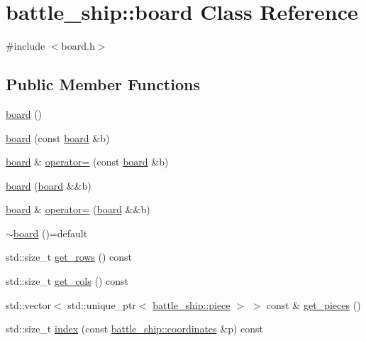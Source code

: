 \hypertarget{classbattle__ship_1_1board}{}\section{battle\+\_\+ship\+:\+:board Class Reference}
\label{classbattle__ship_1_1board}


{\ttfamily \#include $<$board.\+h$>$}

\subsection*{Public Member Functions}
\begin{DoxyCompactItemize}
\item 
\hyperlink{classbattle__ship_1_1board_a4d561505fe0c5d355e70bbd2bde1b00e}{board} ()
\item 
\hyperlink{classbattle__ship_1_1board_a72bdef4b84b4c2d8241b4307cae2cb9e}{board} (const \hyperlink{classbattle__ship_1_1board}{board} \&b)
\item 
\hyperlink{classbattle__ship_1_1board}{board} \& \hyperlink{classbattle__ship_1_1board_a4349c045147f686d09cdc47690f15e34}{operator=} (const \hyperlink{classbattle__ship_1_1board}{board} \&b)
\item 
\hyperlink{classbattle__ship_1_1board_aae7ac9e7bbd44c1b2d7a745721936ee2}{board} (\hyperlink{classbattle__ship_1_1board}{board} \&\&b)
\item 
\hyperlink{classbattle__ship_1_1board}{board} \& \hyperlink{classbattle__ship_1_1board_ae6dc011dea24157e59e2b3a6f34af586}{operator=} (\hyperlink{classbattle__ship_1_1board}{board} \&\&b)
\item 
\hyperlink{classbattle__ship_1_1board_a06d4ef9b5cb2dbb7aa4516464ff1ec52}{$\sim$board} ()=default
\item 
std\+::size\+\_\+t \hyperlink{classbattle__ship_1_1board_a74cf4399466cad172160f005da6d45fa}{get\+\_\+rows} () const
\item 
std\+::size\+\_\+t \hyperlink{classbattle__ship_1_1board_ad3d5995d4b8a0af0cfc802a1731f6a6d}{get\+\_\+cols} () const
\item 
std\+::vector$<$ std\+::unique\+\_\+ptr$<$ \hyperlink{classbattle__ship_1_1piece}{battle\+\_\+ship\+::piece} $>$ $>$ const  \& \hyperlink{classbattle__ship_1_1board_a12358d2f6eabd200d7f4e8f7276ffc96}{get\+\_\+pieces} ()
\item 
std\+::size\+\_\+t \hyperlink{classbattle__ship_1_1board_a6469025697317ca96be621908464a2c0}{index} (const \hyperlink{structbattle__ship_1_1coordinates}{battle\+\_\+ship\+::coordinates} \&p) const

\end{DoxyCompactItemize}

